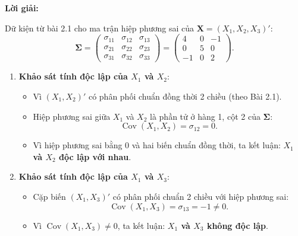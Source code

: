 \documentclass[11pt,a4paper]{article}
\newenvironment{solution}{%
  \par\noindent\textbf{Lời giải:}\ \ignorespaces
}{\par}
\theoremstyle{definition}
\begin{document}
\begin{solution}
Dữ kiện từ bài 2.1 cho ma trận hiệp phương sai của $\mathbf{X} = (X_1, X_2, X_3)'$:
\[
\boldsymbol{\Sigma} = \begin{pmatrix} 
\sigma_{11} & \sigma_{12} & \sigma_{13} \\ 
\sigma_{21} & \sigma_{22} & \sigma_{23} \\ 
\sigma_{31} & \sigma_{32} & \sigma_{33} 
\end{pmatrix} = \begin{pmatrix} 
4 & 0 & -1 \\ 
0 & 5 & 0 \\ 
-1 & 0 & 2 
\end{pmatrix}.
\]

\begin{enumerate}[label=\textbf{\alph*)}]
  \item \textbf{Khảo sát tính độc lập của $X_1$ và $X_2$}:
  \begin{itemize}
    \item Vì $(X_1, X_2)'$ có phân phối chuẩn đồng thời 2 chiều (theo Bài 2.1).
    \item Hiệp phương sai giữa $X_1$ và $X_2$ là phần tử ở hàng 1, cột 2 của $\boldsymbol{\Sigma}$:
    \[
    \operatorname{Cov}(X_1, X_2) = \sigma_{12} = 0.
    \]
    \item Vì hiệp phương sai bằng 0 và hai biến chuẩn đồng thời, ta kết luận: \textbf{$X_1$ và $X_2$ độc lập với nhau}.
  \end{itemize}

  \item \textbf{Khảo sát tính độc lập của $X_1$ và $X_3$}:
  \begin{itemize}
    \item Cặp biến $(X_1, X_3)'$ có phân phối chuẩn 2 chiều với hiệp phương sai:
    \[
    \operatorname{Cov}(X_1, X_3) = \sigma_{13} = -1 \neq 0.
    \]
    \item Vì $\operatorname{Cov}(X_1, X_3) \neq 0$, ta kết luận: \textbf{$X_1$ và $X_3$ không độc lập}.
  \end{itemize}


\end{enumerate}
\end{solution}
\end{document}
